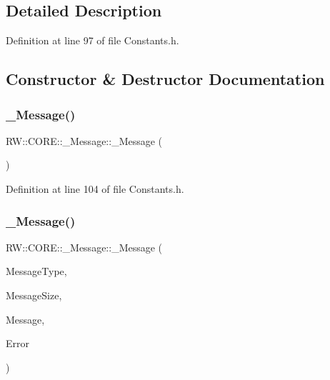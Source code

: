 \subsection{Detailed Description}


Definition at line 97 of file Constants.\+h.



\subsection{Constructor \& Destructor Documentation}
\hypertarget{struct_r_w_1_1_c_o_r_e_1_1___message_ac3c261b3da08864054ea50df9e6d32c8}{}\label{struct_r_w_1_1_c_o_r_e_1_1___message_ac3c261b3da08864054ea50df9e6d32c8} 
\subsubsection{\texorpdfstring{\+\_\+\+Message()}{\_Message()}\hspace{0.1cm}{\footnotesize\ttfamily [1/4]}}
{\footnotesize\ttfamily R\+W\+::\+C\+O\+R\+E\+::\+\_\+\+Message\+::\+\_\+\+Message (\begin{DoxyParamCaption}{ }\end{DoxyParamCaption})\hspace{0.3cm}{\ttfamily [inline]}}



Definition at line 104 of file Constants.\+h.

\hypertarget{struct_r_w_1_1_c_o_r_e_1_1___message_a9b99a2dbdd3c75786a2f90bc91707c36}{}\label{struct_r_w_1_1_c_o_r_e_1_1___message_a9b99a2dbdd3c75786a2f90bc91707c36} 
\subsubsection{\texorpdfstring{\+\_\+\+Message()}{\_Message()}\hspace{0.1cm}{\footnotesize\ttfamily [2/4]}}
{\footnotesize\ttfamily R\+W\+::\+C\+O\+R\+E\+::\+\_\+\+Message\+::\+\_\+\+Message (\begin{DoxyParamCaption}\item[{Util\+::\+Functions}]{Message\+Type,  }\item[{quint16}]{Message\+Size,  }\item[{Q\+Byte\+Array}]{Message,  }\item[{Util\+::\+Error\+ID}]{Error }\end{DoxyParamCaption})\hspace{0.3cm}{\ttfamily [inline]}}



